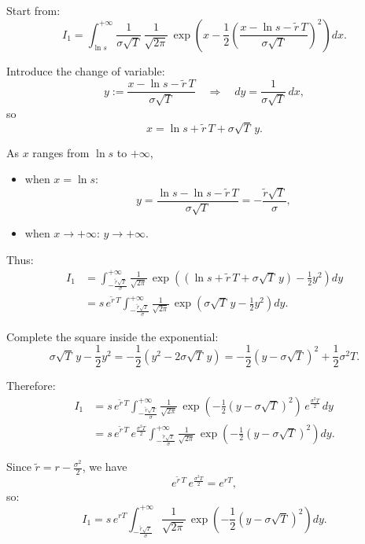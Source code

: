 \documentclass[12pt,a4paper]{article}
\theoremstyle{definition}
\begin{document}
Start from:
\[
I_1 = \int_{\ln s}^{+\infty} \frac{1}{\sigma\sqrt{T}}\, \frac{1}{\sqrt{2\pi}}\, \exp\!\left(x - \frac{1}{2}\left(\frac{x - \ln s - \widetilde{r}\, T}{\sigma\sqrt{T}}\right)^2\right) dx.
\]

Introduce the change of variable:
\[
y := \frac{x - \ln s - \widetilde{r}\, T}{\sigma\sqrt{T}} \quad \Longrightarrow \quad dy = \frac{1}{\sigma\sqrt{T}}\, dx,
\]
so
\[
x = \ln s + \widetilde{r}\, T + \sigma\sqrt{T}\, y.
\]

As $x$ ranges from $\ln s$ to $+\infty$,
\begin{itemize}
\item when $x = \ln s$:
\[
y = \frac{\ln s - \ln s - \widetilde{r}\, T}{\sigma\sqrt{T}} = -\frac{\widetilde{r}\sqrt{T}}{\sigma},
\]
\item when $x \to +\infty$: $y \to +\infty$.
\end{itemize}

Thus:
\[
\begin{aligned}
I_1 &= \int_{-\frac{\widetilde{r}\sqrt{T}}{\sigma}}^{+\infty} \frac{1}{\sqrt{2\pi}}\, \exp\left((\ln s + \widetilde{r}\, T + \sigma\sqrt{T}\, y) - \frac{1}{2}y^2\right) dy \\
&= s\, e^{\widetilde{r}\, T} \int_{-\frac{\widetilde{r}\sqrt{T}}{\sigma}}^{+\infty} \frac{1}{\sqrt{2\pi}}\, \exp\left(\sigma\sqrt{T}\, y - \frac{1}{2}y^2\right) dy.
\end{aligned}
\]

Complete the square inside the exponential:
\[
\sigma\sqrt{T}\, y - \frac{1}{2}y^2 = -\frac{1}{2}(y^2 - 2\sigma\sqrt{T}\, y) = -\frac{1}{2}(y - \sigma\sqrt{T})^2 + \frac{1}{2}\sigma^2 T.
\]

Therefore:
\[
\begin{aligned}
I_1 &= s\, e^{\widetilde{r}\, T} \int_{-\frac{\widetilde{r}\sqrt{T}}{\sigma}}^{+\infty} \frac{1}{\sqrt{2\pi}}\, \exp\left(-\frac{1}{2}(y - \sigma\sqrt{T})^2\right)\, e^{\frac{\sigma^2 T}{2}}\, dy \\
&= s\, e^{\widetilde{r}\, T}\, e^{\frac{\sigma^2 T}{2}} \int_{-\frac{\widetilde{r}\sqrt{T}}{\sigma}}^{+\infty} \frac{1}{\sqrt{2\pi}}\, \exp\left(-\frac{1}{2}(y - \sigma\sqrt{T})^2\right) dy.
\end{aligned}
\]

Since $\widetilde{r} = r - \frac{\sigma^2}{2}$, we have
\[
e^{\widetilde{r}\, T}\, e^{\frac{\sigma^2 T}{2}} = e^{rT},
\]
so:
\[
I_1 = s\, e^{rT} \int_{-\frac{\widetilde{r}\sqrt{T}}{\sigma}}^{+\infty} \frac{1}{\sqrt{2\pi}}\, \exp\left(-\frac{1}{2}(y - \sigma\sqrt{T})^2\right) dy.
\]
\end{document}
